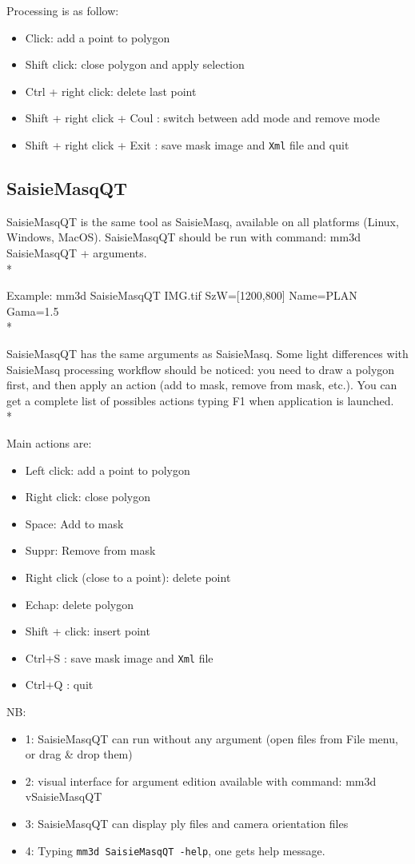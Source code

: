 Processing is as follow:
\begin{itemize}
\item Click: add a point to polygon
\item Shift click: close polygon and apply selection
\item Ctrl + right click: delete last point
\item Shift + right click + Coul : switch between add mode and remove mode
\item Shift + right click + Exit : save mask image and {\tt Xml} file and quit
\end{itemize}

\subsection{SaisieMasqQT}

SaisieMasqQT is the same tool as SaisieMasq, available on all platforms (Linux, Windows, MacOS).
SaisieMasqQT should be run with command: mm3d SaisieMasqQT + arguments.\\*

Example: mm3d SaisieMasqQT IMG.tif SzW=[1200,800] Name=PLAN Gama=1.5\\*

SaisieMasqQT has the same arguments as SaisieMasq. Some light differences with SaisieMasq processing workflow should be noticed:
you need to draw a polygon first, and then apply an action (add to mask, remove from mask, etc.).
You can get a complete list of possibles actions typing F1 when application is launched.\\*

Main actions are:
\begin{itemize}
\item Left click: add a point to polygon
\item Right click: close polygon
\item Space: Add to mask
\item Suppr: Remove from mask
\item Right click (close to a point): delete point
\item Echap: delete polygon
\item Shift + click: insert point
\item Ctrl+S : save mask image and {\tt Xml} file
\item Ctrl+Q : quit
\end{itemize}

NB:
\begin{itemize}
\item 1: SaisieMasqQT can run without any argument (open files from File menu, or drag \& drop them)
\item 2: visual interface for argument edition available with command: mm3d vSaisieMasqQT
\item 3: SaisieMasqQT can display ply files and camera orientation files
\item 4: Typing {\tt mm3d SaisieMasqQT -help}, one gets help message.
\end{itemize}

